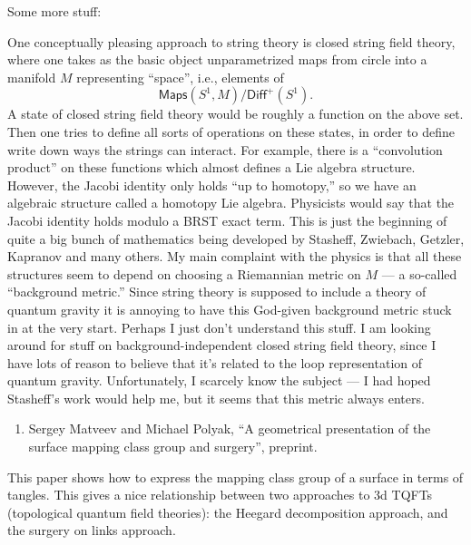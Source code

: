 \documentclass{article}
\def\tightlist{}
\renewcommand{\texttt}[1]{%
  \begingroup
  \ttfamily
  \begingroup\lccode`~=`/\lowercase{\endgroup\def~}{/\discretionary{}{}{}}%
  \begingroup\lccode`~=`[\lowercase{\endgroup\def~}{[\discretionary{}{}{}}%
  \begingroup\lccode`~=`.\lowercase{\endgroup\def~}{.\discretionary{}{}{}}%
  \catcode`/=\active\catcode`[=\active\catcode`.=\active
  \scantokens{#1\noexpand}%
  \endgroup
}
\begin{document}
Some more stuff:

\noindent
One conceptually pleasing approach to string theory is closed string
field theory, where one takes as the basic object unparametrized maps
from circle into a manifold \(M\) representing ``space'', i.e., elements
of \[\mathsf{Maps}(S^1,M)/\mathsf{Diff}^+(S^1).\] A state of closed
string field theory would be roughly a function on the above set. Then
one tries to define all sorts of operations on these states, in order to
define write down ways the strings can interact. For example, there is a
``convolution product'' on these functions which almost defines a Lie
algebra structure. However, the Jacobi identity only holds ``up to
homotopy,'' so we have an algebraic structure called a homotopy Lie
algebra. Physicists would say that the Jacobi identity holds modulo a
BRST exact term. This is just the beginning of quite a big bunch of
mathematics being developed by Stasheff, Zwiebach, Getzler, Kapranov and
many others. My main complaint with the physics is that all these
structures seem to depend on choosing a Riemannian metric on \(M\) --- a
so-called ``background metric.'' Since string theory is supposed to
include a theory of quantum gravity it is annoying to have this
God-given background metric stuck in at the very start. Perhaps I just
don't understand this stuff. I am looking around for stuff on
background-independent closed string field theory, since I have lots of
reason to believe that it's related to the loop representation of
quantum gravity. Unfortunately, I scarcely know the subject --- I had
hoped Stasheff's work would help me, but it seems that this metric
always enters.

\begin{enumerate}
\def\labelenumi{\arabic{enumi})}
\setcounter{enumi}{4}
\tightlist
\item
  Sergey Matveev and Michael Polyak, ``A geometrical presentation of the surface mapping 
  class group and surgery'', preprint.
\end{enumerate}
\noindent
This paper shows how to express the mapping class group of a surface in
terms of tangles. This gives a nice relationship between two approaches
to 3d TQFTs (topological quantum field theories): the Heegard
decomposition approach, and the surgery on links approach.
\end{document}
